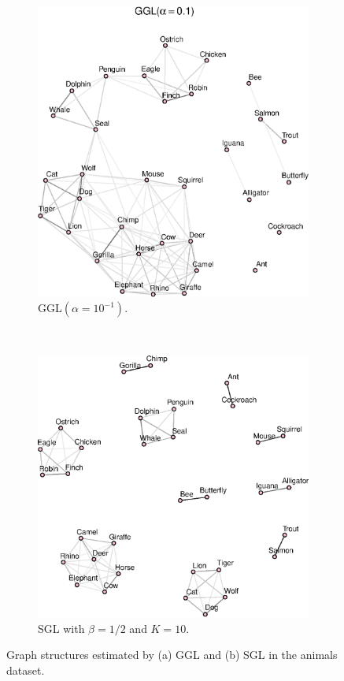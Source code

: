 \begin{figure}[!htb]
    \centering
    \begin{subfigure}[b]{0.475\textwidth}
      \includegraphics[width=\textwidth]{animals/animals_graph_ggl_alpha01.eps}
      \caption{\textsf{GGL}$(\alpha = 10^{-1})$.}
    \end{subfigure}
    ~
    \begin{subfigure}[b]{0.475\textwidth}
      \includegraphics[width=\textwidth]{animals/animals_graph_k10.eps}
      \caption{\textsf{SGL} with $\beta = 1/2$ and $K = 10$.}
    \end{subfigure}
    \caption{Graph structures estimated by (a) \textsf{GGL} and (b) \textsf{SGL} in the \textsf{animals} dataset.}
    \label{fig:animals}
\end{figure}
